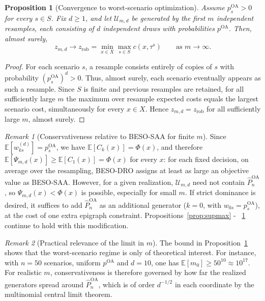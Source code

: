 \documentclass[mnsc,sglanonrev]{informs4}  %
\newtheorem{proposition}{Proposition}
\theoremstyle{remark}\newtheorem{remark}{Remark}
\begin{document}
\begin{APPENDICES}
\begin{proposition}[Convergence to worst-scenario optimization] \label{prop:DROrobust}
Assume $p_s^{\mathrm{OA}}>0$ for every $s\in S$.
Fix $d\ge1$, and let $\mathcal U_{m,d}$ be generated by the first $m$ independent resamples, each consisting of $d$ independent draws with probabilities $p^{\mathrm{OA}}$.
Then, almost surely,
\[
z_{m,d}\longrightarrow z_{\mathrm{rob}} =\min_{x\in X}\max_{s\in S}c(x,\tau^s) \qquad\text{as }m\to\infty.
\]
\end{proposition}

\begin{proof}
For each scenario $s$, a resample consists entirely of copies of $s$ with probability $(p_s^{\mathrm{OA}})^d>0$.
Thus, almost surely, each scenario eventually appears as such a resample. Since $S$ is finite and previous resamples are retained, for all sufficiently large $m$ the maximum over resample expected costs equals the largest scenario cost, simultaneously for every $x\in X$.
Hence $z_{m,d}=z_{\mathrm{rob}}$ for all sufficiently large $m$, almost surely.
\end{proof}

\begin{remark}[Conservativeness relative to BESO-SAA for finite $m$]
Since $\mathbb E[w^{(d)}_{ks}]=p^{\mathrm{OA}}_s$, we have $\mathbb E[C_k(x)]=\Phi(x)$, and therefore $\mathbb E[\Psi_{m,d}(x)]\ge\mathbb E[C_1(x)]=\Phi(x)$ for every $x$: for each fixed decision, on average over the resampling, BESO-DRO assigns at least as large an objective value as BESO-SAA. 
However, for a given realization, $\mathcal U_{m,d}$ need not contain $\widehat P^{\mathrm{OA}}_n$, so $\Psi_{m,d}(x)<\Phi(x)$ is possible, especially for small $m$. 
If strict dominance is desired, it suffices to add $\widehat P^{\mathrm{OA}}_n$ as an additional generator ($k=0$, with $w_{0s}=p^{\mathrm{OA}}_s$), at the cost of one extra epigraph constraint. Propositions~\ref{prop:supmax} - ~\ref{prop:DROrobust} continue to hold with this modification.
\end{remark}

\begin{remark}[Practical relevance of the limit in $m$]
The bound in Proposition~\ref{prop:DROrobust} shows that the worst-scenario regime is only of theoretical interest. For instance, with $n=50$ scenarios, uniform $p^{\mathrm{OA}}$ and $d=10$, one has $\mathbb E[m_0]\ge 50^{10}\approx10^{17}$. For realistic $m$, conservativeness is therefore governed by how far the realized generators spread around $\widehat P^{\mathrm{OA}}_n$, which is of order $d^{-1/2}$ in each coordinate by the multinomial central limit theorem.
\end{remark}
\end{APPENDICES}
\end{document}
